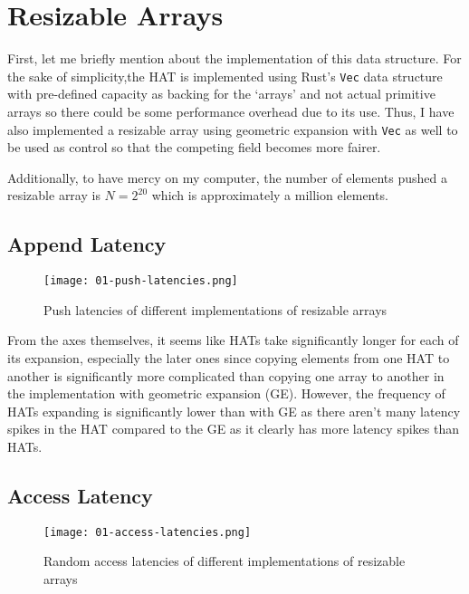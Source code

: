 \section{Resizable Arrays}

First, let me briefly mention about the implementation of this data structure. For the sake of simplicity,the HAT is implemented using Rust's \texttt{Vec} data structure with pre-defined capacity as backing for the `arrays' and not actual primitive arrays so there could be some performance overhead due to its use. Thus, I have also implemented a resizable array using geometric expansion with \texttt{Vec} as well to be used as control so that the competing field becomes more fairer.

Additionally, to have mercy on my computer, the number of elements pushed a resizable array is $N = 2^{20}$ which is approximately a million elements.

\begingroup

\subsection{Append Latency}

\begin{center}
	\begin{figure}[H]
		\texttt{[image: 01-push-latencies.png]}
		\caption{Push latencies of different implementations of resizable arrays}
		\label{fig:push-latency}
	\end{figure}
\end{center}

From the axes themselves, it seems like HATs take significantly longer for each of its expansion, especially the later ones since copying elements from one HAT to another is significantly more complicated than copying one array to another in the implementation with geometric expansion (GE). However, the frequency of HATs expanding is significantly lower than with GE as there aren't many latency spikes in the HAT compared to the GE as it clearly has more latency spikes than HATs.

\endgroup

\begingroup

\subsection{Access Latency}

\begin{center}
	\begin{figure}[H]
		\texttt{[image: 01-access-latencies.png]}
		\caption{Random access latencies of different implementations of resizable arrays}
		\label{fig:get-latency}
	\end{figure}
\end{center}

